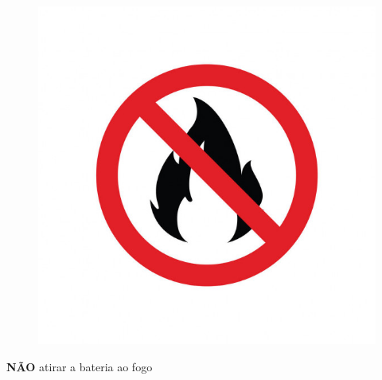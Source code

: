  \begin{center}
  
    \begin{figure}[H]
       \centering
	\label{iconefogo}					\includegraphics[keepaspectratio=true,scale=0.13]{Figuras/bateria/iconefogo.jpg}
        \label{iconefogo}
	\end{figure} 
		\textbf{NÃO} atirar a bateria ao fogo
\end{center}

